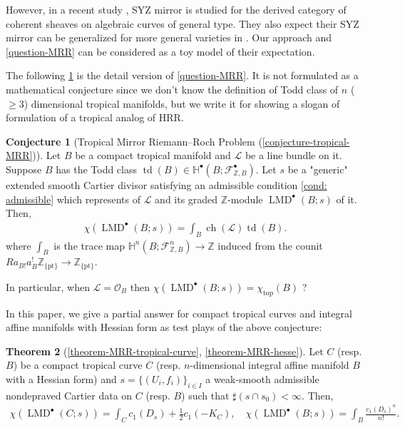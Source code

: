 \documentclass[a4paper,dvipdfmx,reqno,12pt]{amsart}
\theoremstyle{definition}
\newtheorem{theorem}{Theorem}[section]
\newtheorem{conjecture}[theorem]{Conjecture}
\newcommand{\Z}{\mathbb{Z}}%
\newcommand{\mb}[1]{\mathbb{#1}}%
\newcommand{\mcal}[1]{\mathcal{#1}}%
\newcommand{\opn}[1]{\operatorname{#1}}
\numberwithin{equation}{section}
\begin{document}
However, in a recent study 
\cite{auroux2022lagrangian}, 
SYZ mirror is studied for the derived category 
of coherent sheaves on algebraic curves 
of general type. 
They also expect their SYZ mirror can be generalized for more
general varieties in \cite[{}]{auroux2022lagrangian}.
Our approach and \cref{question-MRR} can be considered as 
a toy model of their expectation. 

The following \cref{conjecture-tropical-MRR-preface}
is the detail version of \cref{question-MRR}.
It is not formulated as a mathematical 
conjecture since we don't know the definition of Todd 
class of $n$ ($\geq 3$) dimensional tropical manifolds,
but we write it for showing a slogan of formulation 
of a tropical analog of HRR.

\begin{conjecture}[{Tropical Mirror Riemann--Roch Problem
(\cref{conjecture-tropical-MRR})}]
\label{conjecture-tropical-MRR-preface}
Let $B$ be a compact tropical manifold and $\mcal{L}$
be a line bundle on it. Suppose $B$ has the Todd class
$\opn{td}(B) \in \mb{H}^{\bullet}(B;\mcal{F}_{\Z, B}^{\bullet})$.
 Let $s$ be a "generic"
extended smooth Cartier divisor satisfying an admissible condition 
\cref{cond: admissible} which represents of $\mcal{L}$
and its graded $\Z$-module $\opn{LMD}^{\bullet}(B;s)$
of it.
Then,
\begin{align}
\chi(\opn{LMD}^{\bullet}(B;s))=\int_B \opn{ch}(\mcal{L})\opn{td}(B).
\end{align}
where $\int_B$ is the trace map 
$\mb{H}^{n}(B;\mcal{F}_{\Z, B}^{n})\to \Z$
induced from the counit 
$Ra_{B!}a_{B}^{!}\mathbb{Z}_{\{\mathrm{pt}\}}
\to \mathbb{Z}_{\{\mathrm{pt}\}}$.

In particular, when $\mcal{L}=\mcal{O}_B$ then
$\chi(\opn{LMD}^{\bullet}(B;s))=\chi_{\opn{top}}(B)$ ?
\end{conjecture}



In this paper, we give a partial answer for compact tropical curves 
and integral affine manifolds with Hessian form
as test plays of the above conjecture:

\begin{theorem}[{\cref{theorem-MRR-tropical-curve},
\cref{theorem-MRR-hesse}}] \label{thm: main}
Let $C$ (resp. $B$) be a compact tropical curve $C$ 
(resp. $n$-dimensional integral 
affine manifold $B$
with a Hessian form) and $s=\{(U_i,f_i)\}_{i\in I}$ a
weak-smooth admissible nondepraved
Cartier data on $C$ (resp. $B$) such that 
$\sharp(s\cap s_0)<\infty$. Then,
\begin{align}
\chi(\opn{LMD}^{\bullet}(C;s))=\int_C c_1(D_s)+\frac{1}{2}c_1(-K_C), \quad 
\chi(\opn{LMD}^{\bullet}(B;s))=\int_B \frac{c_1(D_s)^{n}}{n!}.
\end{align}
\end{theorem}
\end{document}
